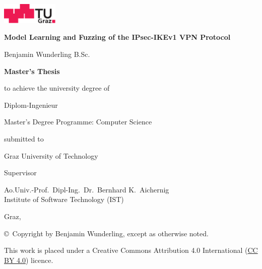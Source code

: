 \begin{center}
\includegraphics[height=1cm]{diagrams/tugraz-logo.pdf}

\vspace{2cm}

\begin{spacing}{1.1}
\huge\sffamily\bfseries
Model Learning and Fuzzing of the IPsec-IKEv1 VPN Protocol\\
\end{spacing}

\vspace{2cm}

{\Large\sffamily Benjamin Wunderling B.Sc.}

\vspace{2cm}

{\Large\sffamily\bfseries Master's Thesis}

\vspace{5mm}

{\small\sffamily to achieve the university degree of}

\vspace{5mm}

{\normalsize\sffamily Diplom-Ingenieur}

\vspace{5mm}

{\normalsize\sffamily
Master's Degree Programme: Computer Science
}


\vspace{1cm}

{\small\sffamily submitted to}

\vspace{5mm}

{\large\sffamily Graz University of Technology}



\vspace{1cm}

{\small\sffamily Supervisor}

\vspace{5mm}

{\normalsize\sffamily
Ao.Univ.-Prof.\ Dipl-Ing.\ Dr.\ Bernhard K.~Aichernig \\
Institute of Software Technology (IST)
}


\vspace{1cm}

{\normalsize\sffamily Graz, \thisdate}



\vfill

{\footnotesize\sffamily \copyright~Copyright \thisyear{} by Benjamin Wunderling,
except as otherwise noted.}

{\footnotesize\sffamily This work is placed under a
Creative Commons Attribution 4.0 International
(\href{https://creativecommons.org/licenses/by/4.0/}{CC BY 4.0}) licence.}


\end{center}





